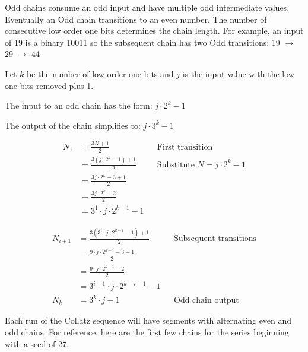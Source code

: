 \documentclass[preprint]{sigplanconf}
\begin{document}
Odd chains consume an odd input and have multiple odd intermediate values. Eventually an Odd chain transitions to an even number. The number of consecutive low order one bits determines the chain length. For example, an input of 19 is a binary 10011 so the subsequent chain has two Odd transitions: 19 $\to$ 29 $\to$ 44

Let \( k \) be the number of low order one bits and \( j \) is the input value with the low one bits removed plus 1.

The input to an odd chain has the form: \( j \cdot 2^k - 1 \)

The output of the chain simplifies to: \( j \cdot 3^k - 1 \)

\begin{align*}
    N_1 & = \frac{3N + 1}{2}                 &  & \text{First transition}                \\
        & = \frac{3(j \cdot 2^k - 1) + 1}{2} &  & \text{Substitute } N = j \cdot 2^k - 1 \\
        & = \frac{3j \cdot 2^k - 3 + 1}{2}                                               \\
        & = \frac{3j \cdot 2^k - 2}{2}                                                   \\
        & = 3^1 \cdot j \cdot 2^{k-1} - 1
\end{align*}

\begin{align*}
    N_{i+1} & = \frac{3 \left(3^i \cdot j \cdot 2^{k-i} - 1\right) + 1}{2} &  & \text{Subsequent transitions} \\
            & = \frac{9 \cdot j \cdot 2^{k-i} - 3 + 1}{2}                                                     \\
            & = \frac{9 \cdot j \cdot 2^{k-i} - 2}{2}                                                         \\
            & = 3^{i+1} \cdot j \cdot 2^{k-i-1} - 1                                                           \\
    N_k     & = 3^k \cdot j - 1                                            &  & \text{Odd chain output}
\end{align*}

Each run of the Collatz sequence will have segments with alternating even and odd chains. For reference, here are the first few chains for the series beginning with a seed of 27.
\end{document}
